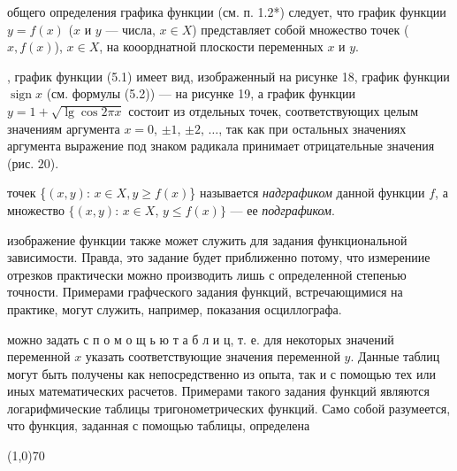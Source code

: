 \documentclass{article}
\DeclareMathOperator{\sign}{sign}
\newcommand\tab[1][0,5cm]{\hspace*{#1}}
\begin{document}
\begin{figure}[h]
\end{figure}
{\fontsize{15,8pt}{18pt}\selectfont
{} общего определения графика функции (см. п. 1.2*) следует, что график функции $y = f(x)$ ($x$ и $y$ --- числа, $x \in X$) представляет собой множество точек 
($x, f(x)$), $x \in X$, на кооорднатной плоскости переменных $x$ и $y$.}

{\fontsize{15,8pt}{18pt}\selectfont
{}, график функции (5.1) имеет вид, изображенный на рисунке 18, график функции $\sign x$ (см. формулы (5.2)) --- на рисунке 19, а график функции $y = 1 + \sqrt{\lg \cos 2\pi x}$ состоит из отдельных точек, соответствующих целым значениям аргумента $x = 0$, $\pm1$, $\pm2$, $\ldots$, так как при остальных значениях аргумента выражение под знаком радикала принимает отрицательные значения (рис. $20$).}

{\fontsize{15,8pt}{18pt}\selectfont
{} точек \{$(x, y)$: $x \in X, y \geqslant f(x)$\} называется \textit{надграфиком} данной функции $f$, а множество $\{(x, y)$: $x \in X$, $y \leqslant f(x)\}$ --- ее \textit{подграфиком}.}

{\fontsize{15,8pt}{18pt}\selectfont
{} изображение функции также может служить для задания функциональной зависимости. Правда, это задание будет приближенно потому, что измерениие отрезков практически можно производить лишь с определенной степенью точности. Примерами графческого задания функций, встречающимися на практике, могут служить, например, показания осциллографа.}

{\fontsize{15,8pt}{18pt}\selectfont
{} можно задать  с п о м о щ ь ю  т а б л и ц, т. е. для некоторых значений переменной $x$ указать соответствующие значения переменной $y$. Данные таблиц могут быть получены как непосредственно из опыта, так и с помощью тех или иных математических расчетов. Примерами такого задания функций являются логарифмические таблицы тригонометрических функций. Само собой разумеется, что функция, заданная с помощью таблицы, определена}

\begin{center}
   \line(1,0){70}
\end{center}
\newpage
\end{document}
